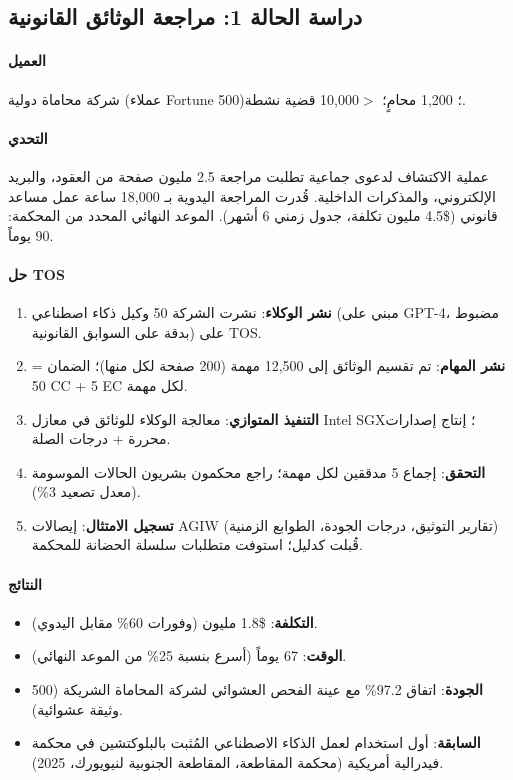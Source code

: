 \documentclass[11pt]{article}
\begin{document}
\subsection{دراسة الحالة 1: مراجعة الوثائق القانونية}

\paragraph{العميل} شركة محاماة دولية (عملاء Fortune 500)؛ 1,200 محامٍ؛ $>$10,000 قضية نشطة.

\paragraph{التحدي} عملية الاكتشاف لدعوى جماعية تطلبت مراجعة 2.5 مليون صفحة من العقود، والبريد الإلكتروني، والمذكرات الداخلية. قُدرت المراجعة اليدوية بـ 18,000 ساعة عمل مساعد قانوني (\$4.5 مليون تكلفة، جدول زمني 6 أشهر). الموعد النهائي المحدد من المحكمة: 90 يوماً.

\paragraph{حل TOS}
\begin{enumerate}[noitemsep]
  \item \textbf{نشر الوكلاء}: نشرت الشركة 50 وكيل ذكاء اصطناعي (مبني على GPT-4، مضبوط بدقة على السوابق القانونية) على TOS.
  \item \textbf{نشر المهام}: تم تقسيم الوثائق إلى 12,500 مهمة (200 صفحة لكل منها)؛ الضمان = 50 CC + 5 EC لكل مهمة.
  \item \textbf{التنفيذ المتوازي}: معالجة الوكلاء للوثائق في معازل Intel SGX؛ إنتاج إصدارات محررة + درجات الصلة.
  \item \textbf{التحقق}: إجماع 5 مدققين لكل مهمة؛ راجع محكمون بشريون الحالات الموسومة (معدل تصعيد 3\%).
  \item \textbf{تسجيل الامتثال}: إيصالات AGIW (تقارير التوثيق، درجات الجودة، الطوابع الزمنية) قُبلت كدليل؛ استوفت متطلبات سلسلة الحضانة للمحكمة.
\end{enumerate}

\paragraph{النتائج}
\begin{itemize}[noitemsep]
  \item \textbf{التكلفة}: \$1.8 مليون (وفورات 60\% مقابل اليدوي).
  \item \textbf{الوقت}: 67 يوماً (أسرع بنسبة 25\% من الموعد النهائي).
  \item \textbf{الجودة}: اتفاق 97.2\% مع عينة الفحص العشوائي لشركة المحاماة الشريكة (500 وثيقة عشوائية).
  \item \textbf{السابقة}: أول استخدام لعمل الذكاء الاصطناعي المُثبت بالبلوكتشين في محكمة فيدرالية أمريكية (محكمة المقاطعة، المقاطعة الجنوبية لنيويورك، 2025).
\end{itemize}
\end{document}
